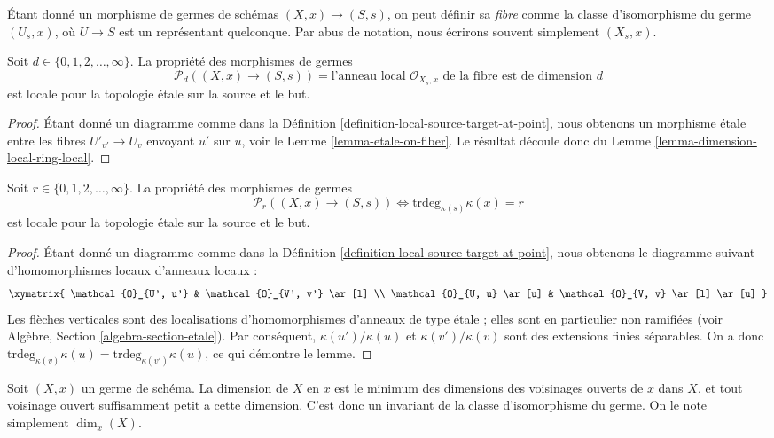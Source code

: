 \noindent
Étant donné un morphisme de germes de schémas $(X, x) \to (S, s)$,
on peut définir sa {\it fibre} comme la classe d'isomorphisme du germe
$(U_s, x)$, où $U \to S$ est un représentant quelconque. Par abus de
notation, nous écrirons souvent simplement $(X_s, x)$.

\begin{lemma}
\label{lemma-dimension-local-ring-fibre}
Soit $d \in \{0, 1, 2, \ldots, \infty\}$.
La propriété des morphismes de germes
$$
\mathcal{P}_d((X, x) \to (S, s)) =
\text{l'anneau local }
\mathcal{O}_{X_s, x}
\text{ de la fibre est de dimension }d
$$
est locale pour la topologie \'etale sur la source et le but.
\end{lemma}

\begin{proof}
Étant donné un diagramme comme dans la
Définition \ref{definition-local-source-target-at-point}, nous obtenons un
morphisme \'etale entre les fibres $U'_{v'} \to U_v$ envoyant $u'$ sur $u$,
voir le Lemme \ref{lemma-etale-on-fiber}. Le résultat découle donc du
Lemme \ref{lemma-dimension-local-ring-local}.
\end{proof}

\begin{lemma}
\label{lemma-transcendence-degree-at-point}
Soit $r \in \{0, 1, 2, \ldots, \infty\}$.
La propriété des morphismes de germes
$$
\mathcal{P}_r((X, x) \to (S, s))
\Leftrightarrow
\text{trdeg}_{\kappa(s)} \kappa(x) = r
$$
est locale pour la topologie \'etale sur la source et le but.
\end{lemma}

\begin{proof}
Étant donné un diagramme comme dans la
Définition \ref{definition-local-source-target-at-point}, nous obtenons le
diagramme suivant d'homomorphismes locaux d'anneaux locaux :
$$
\xymatrix{
\mathcal{O}_{U', u'} & \mathcal{O}_{V', v'} \ar[l] \\
\mathcal{O}_{U, u} \ar[u] & \mathcal{O}_{V, v} \ar[l] \ar[u]
}
$$
Les flèches verticales sont des localisations d'homomorphismes d'anneaux
de type \'etale ; elles sont en particulier non ramifiées (voir
Algèbre, Section \ref{algebra-section-etale}).
Par conséquent, $\kappa(u')/\kappa(u)$ et $\kappa(v')/\kappa(v)$ sont des
extensions finies séparables. On a donc
$\text{trdeg}_{\kappa(v)} \kappa(u) = \text{trdeg}_{\kappa(v')} \kappa(u)$,
ce qui démontre le lemme.
\end{proof}

\noindent
Soit $(X, x)$ un germe de schéma. La dimension de $X$ en $x$ est le minimum
des dimensions des voisinages ouverts de $x$ dans $X$, et tout voisinage
ouvert suffisamment petit a cette dimension. C'est donc un invariant de la
classe d'isomorphisme du germe. On le note simplement $\dim_x(X)$.

